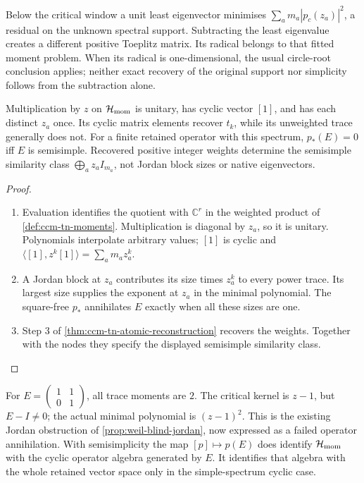 Below the critical window a unit least eigenvector minimises
$\sum_a m_a|p_c(z_a)|^2$, a residual on the unknown spectral support.
Subtracting the least eigenvalue creates a different positive Toeplitz
matrix. Its radical belongs to that fitted moment problem. When its
radical is one-dimensional, the usual circle-root conclusion applies;
neither exact recovery of the original support nor simplicity follows
from the subtraction alone.

\begin{proposition}
\label{prop:ccm-tn-trace-semisimplification}
Multiplication by $z$ on $\mathcal H_{\mathrm{mom}}$ is unitary, has cyclic vector
$[1]$, and has each distinct $z_a$ once. Its cyclic matrix elements
recover $t_k$, while its unweighted trace generally does not.
For a finite retained operator with this spectrum,
$p_*(E)=0$ iff $E$ is semisimple. Recovered positive integer weights
determine the semisimple similarity class
$\bigoplus_a z_a I_{m_a}$, not Jordan block sizes or native eigenvectors.
\end{proposition}
\begin{proof}
\begin{enumerate}
\item[$\langle1\rangle$1.] Evaluation identifies the quotient with
$\mathbb C^r$ in the weighted product of
\cref{def:ccm-tn-moments}. Multiplication is diagonal by $z_a$,
so it is unitary. Polynomials interpolate arbitrary values; $[1]$ is
cyclic and $\langle[1],z^k[1]\rangle=\sum_a m_a z_a^k$.
\item[$\langle1\rangle$2.] A Jordan block at $z_a$ contributes its
size times $z_a^k$ to every power trace. Its largest size supplies
the exponent at $z_a$ in the minimal polynomial. The square-free
$p_*$ annihilates $E$ exactly when all these sizes are one.
\item[$\langle1\rangle$3.] Step 3 of
\cref{thm:ccm-tn-atomic-reconstruction} recovers the weights. Together
with the nodes they specify the displayed semisimple similarity class.
\end{enumerate}
\end{proof}

For $E=\left(\begin{smallmatrix}1&1\\0&1\end{smallmatrix}\right)$,
all trace moments are $2$. The critical kernel is $z-1$, but
$E-I\ne0$; the actual minimal polynomial is $(z-1)^2$.
This is the existing Jordan obstruction of
\cref{prop:weil-blind-jordan}, now expressed as a failed operator
annihilation. With semisimplicity the map $[p]\mapsto p(E)$ does
identify $\mathcal H_{\mathrm{mom}}$ with the cyclic operator algebra generated by
$E$. It identifies that algebra with the whole retained vector space
only in the simple-spectrum cyclic case.

